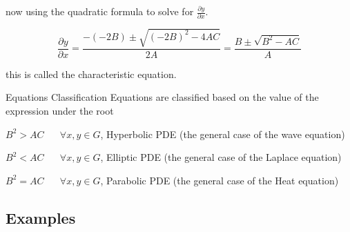 \documentclass[]{article}
\begin{document}
now using the quadratic formula to solve for $\frac{\partial y}{\partial x}$.

\[
    \frac{\partial y}{\partial x} = \frac{-\left(-2B\right)\pm\sqrt{{(-2B)}^2 -4AC}}{2A} = \frac{B\pm\sqrt{B^2 -AC}}{A}    
\]

this is called the characteristic equation.

\begin{enrichment*}{Equations Classification}
Equations are classified based on the value of the expression under the root

$B^2 > AC \;\;\;\;\;\; \forall x,y\in G$, Hyperbolic PDE (the general case of the wave equation) 

$B^2 < AC \;\;\;\;\;\; \forall x,y\in G$, Elliptic PDE (the general case of the Laplace equation) 

$B^2 = AC \;\;\;\;\;\; \forall x,y\in G$, Parabolic PDE (the general case of the Heat equation) 
\end{enrichment*}


\subsection{Examples}
\end{document}
